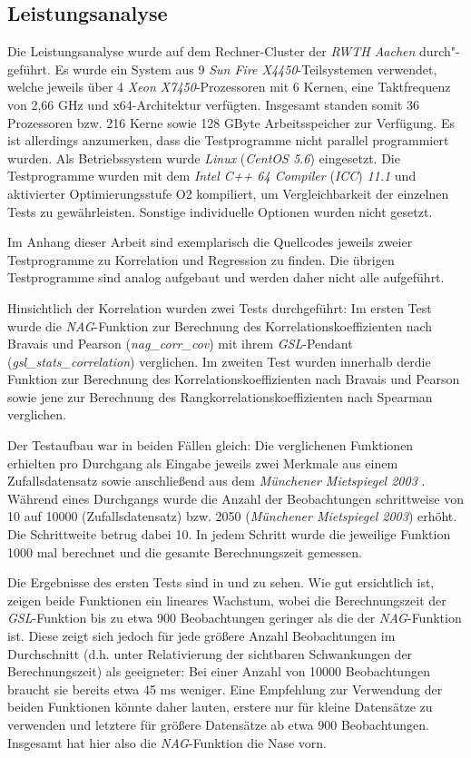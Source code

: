 \subsection{Leistungsanalyse}
\label{sec:leistungsanalyse}

Die Leistungsanalyse wurde auf dem Rechner-Cluster der {\it RWTH Aachen} durch"-geführt. Es wurde ein System aus 9 {\it Sun Fire X4450}-Teilsystemen verwendet, welche jeweils über 4 {\it Xeon X7450}-Prozessoren mit 6 Kernen, eine Taktfrequenz von 2,66 GHz und x64-Architektur verfügten. Insgesamt standen somit 36 Prozessoren bzw. 216 Kerne sowie 128 GByte Arbeitsspeicher zur Verfügung. Es ist allerdings anzumerken, dass die Testprogramme nicht parallel programmiert wurden. Als Betriebssystem wurde {\it Linux} ({\it CentOS 5.6}) eingesetzt. Die Testprogramme wurden mit dem {\it Intel C++ 64 Compiler} ({\it ICC}) {\it 11.1} und aktivierter Optimierungsstufe O2 kompiliert, um Vergleichbarkeit der einzelnen Tests zu gewährleisten. Sonstige individuelle Optionen wurden nicht gesetzt.

Im Anhang dieser Arbeit sind exemplarisch die Quellcodes jeweils zweier Testprogramme zu Korrelation und Regression zu finden. Die übrigen Testprogramme sind analog aufgebaut und werden daher nicht alle aufgeführt.

Hinsichtlich der Korrelation wurden zwei Tests durchgeführt: Im ersten Test wurde die {\it NAG}-Funktion zur Berechnung des Korrelationskoeffizienten nach Bravais und Pearson ({\it nag\_corr\_cov}) mit ihrem {\it GSL}-Pendant ({\it gsl\_stats\_correlation}) verglichen. Im zweiten Test wurden innerhalb der\naglib die Funktion zur Berechnung des Korrelationskoeffizienten nach Bravais und Pearson sowie jene zur Berechnung des Rangkorrelationskoeffizienten nach Spearman verglichen.

Der Testaufbau war in beiden Fällen gleich: Die verglichenen Funktionen erhielten pro Durchgang als Eingabe jeweils zwei Merkmale aus einem Zufallsdatensatz sowie anschließend aus dem {\it Münchener Mietspiegel 2003} \cite{Fahrmeir2011}. Während eines Durchgangs wurde die Anzahl der Beobachtungen schrittweise von 10 auf 10000 (Zufallsdatensatz) bzw. 2050 ({\it Münchener Mietspiegel 2003}) erhöht. Die Schrittweite betrug dabei 10. In jedem Schritt wurde die jeweilige Funktion 1000 mal berechnet und die gesamte Berechnungszeit gemessen.

Die Ergebnisse des ersten Tests sind in  und  zu sehen. Wie gut ersichtlich ist, zeigen beide Funktionen ein lineares Wachstum, wobei die Berechnungszeit der {\it GSL}-Funktion bis zu etwa 900 Beobachtungen geringer als die der {\it NAG}-Funktion ist. Diese zeigt sich jedoch für jede größere Anzahl Beobachtungen im Durchschnitt (d.h. unter Relativierung der sichtbaren Schwankungen der Berechnungszeit) als geeigneter: Bei einer Anzahl von 10000 Beobachtungen braucht sie bereits etwa 45 ms weniger. Eine Empfehlung zur Verwendung der beiden Funktionen könnte daher lauten, erstere nur für kleine Datensätze zu verwenden und letztere für größere Datensätze ab etwa 900 Beobachtungen. Insgesamt hat hier also die {\it NAG}-Funktion die Nase vorn.

